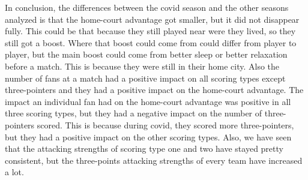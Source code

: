 
\noindent In conclusion, the differences between the covid season and the other seasons analyzed is that the home-court advantage got smaller, but it did not disappear fully. This could be that because they still played near were they lived, so they still got a boost. Where that boost could come from could differ from player to player, but the main boost could come from better sleep or better relaxation before a match. This is because they were still in their home city. Also the number of fans at a match had a positive impact on all scoring types except three-pointers and they had a positive impact on the home-court advantage. The impact an individual fan had on the home-court advantage was positive in all three scoring types, but they had a negative impact on the number of three-pointers scored. This is because during covid, they scored more three-pointers, but they had a positive impact on the other scoring types. Also, we have seen that the attacking strengths of scoring type one and two have stayed pretty consistent, but the three-points attacking strengths of every team have increased a lot.
